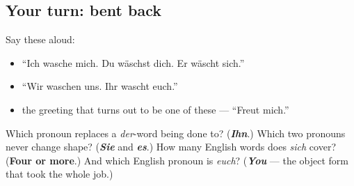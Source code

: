 \subsection*{Your turn: bent back}
Say these aloud:

\begin{itemize}
\raggedright
  \item \textquotedblleft{}Ich wasche mich. Du wäschst dich. Er wäscht sich.\textquotedblright{}
  \item \textquotedblleft{}Wir waschen uns. Ihr wascht euch.\textquotedblright{}
  \item the greeting that turns out to be one of these — \textquotedblleft{}Freut mich.\textquotedblright{}
\end{itemize}

\begin{tcolorbox}[breakable,colback=teal!4,colframe=teal!35!black,title={Before you move on}]
Which pronoun replaces a \emph{der}-word being done to? (\emph{\textbf{Ihn}}.) Which two pronouns never change shape? (\emph{\textbf{Sie}} and \emph{\textbf{es}}.) How many English words does \emph{sich} cover? (\textbf{Four or more}.) And which English pronoun is \emph{euch}? (\emph{\textbf{You}} — the object form that took the whole job.)
\end{tcolorbox}

